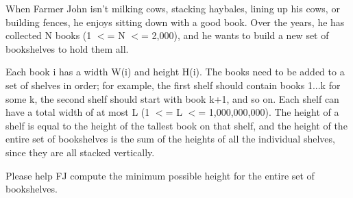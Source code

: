 When Farmer John isn't milking cows, stacking haybales, lining up his cows, or building fences, he enjoys sitting down with a good book.  Over the years, he has collected N books (1 $<$= N $<$= 2,000), and he wants to build a new set of bookshelves to hold them all. 

Each book i has a width W(i) and height H(i).  The books need to be added to a set of shelves in order; for example, the first shelf should contain books 1...k for some k, the second shelf should start with book k+1, and so on.  Each shelf can have a total width of at most L (1 $<$= L $<$= 1,000,000,000).  The height of a shelf is equal to the height of the tallest book on that shelf, and the height of the entire set of bookshelves is the sum of the heights of all the individual shelves, since they are all stacked vertically.

Please help FJ compute the minimum possible height for the entire set of bookshelves.